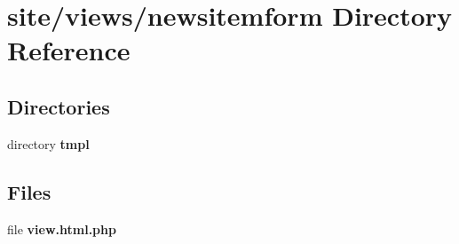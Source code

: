 \section{site/views/newsitemform Directory Reference}
\label{dir_d12988956723d79d28276710aa225da9}
\subsection*{Directories}
\begin{DoxyCompactItemize}
\item 
directory \textbf{ tmpl}
\end{DoxyCompactItemize}
\subsection*{Files}
\begin{DoxyCompactItemize}
\item 
file \textbf{ view.\+html.\+php}
\end{DoxyCompactItemize}
